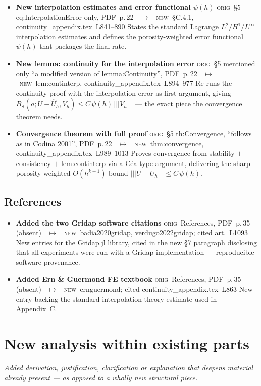\documentclass[11pt]{article}
\newcommand{\Orig}{\textcolor{origc}{\footnotesize\textsc{orig}}}
\newcommand{\New}{\textcolor{newc}{\footnotesize\textsc{new}}}
\newcommand{\code}[1]{\textcolor{newc}{\ttfamily\small #1}}
\newcommand{\pdfp}[1]{PDF~p.\,#1}
\newcommand{\artl}[1]{art.\ L#1}       %
\newcommand{\appl}[2]{#1~L#2}          %
\newcommand{\ch}[4]{%
  \item \textbf{#1}\newline
    {\footnotesize\Orig\ #2 \ \textcolor{locc}{$\longmapsto$} \ \New\ #3}\newline
    #4}
\begin{document}
\begin{itemize}
   {\code{lem:continuity}, \appl{continuity\_appendix.tex}{381}--817}
   {$B_{\mathrm S}$ is split into 18 terms mirroring Codina (2001) (42)--(59), each bounded by the
    triple norm through nine explicit steps, incl.\ the convective-pressure integration-by-parts
    group and facewise jump bookkeeping. The appendix's core result.}
\ch{New interpolation estimates and error functional $\psi(h)$}
   {\S5 \code{eq:InterpolationError} only, \pdfp{22}}
   {\S C.4.1, \appl{continuity\_appendix.tex}{841}--890}
   {States the standard Lagrange $L^2/H^1/L^\infty$ interpolation estimates and defines the
    porosity-weighted error functional $\psi(h)$ that packages the final rate.}
\ch{New lemma: continuity for the interpolation error}
   {\S5 mentioned only ``a modified version of \code{lemma:Continuity}'', \pdfp{22}}
   {\code{lem:continterp}, \appl{continuity\_appendix.tex}{894}--977}
   {Re-runs the continuity proof with the interpolation error as first argument, giving
    $B_{\mathrm S}(a;U-\widehat U_h,V_h)\le C\,\psi(h)\,|\!|\!|V_h|\!|\!|$ --- the exact piece the
    convergence theorem needs.}
\ch{Convergence theorem with full proof}
   {\S5 \code{th:Convergence}, ``follows as in Codina 2001'', \pdfp{22}}
   {\code{thm:convergence}, \appl{continuity\_appendix.tex}{989}--1013}
   {Proves convergence from stability $+$ consistency $+$ \code{lem:continterp} via a C\'ea-type
    argument, delivering the sharp porosity-weighted $O(h^{k+1})$ bound $|\!|\!|U-U_h|\!|\!|\le
    C\,\psi(h)$.}
\end{itemize}

\subsection{References}
\begin{itemize}
\ch{Added the two Gridap software citations}
   {References, \pdfp{35} (absent)}
   {\code{badia2020gridap}, \code{verdugo2022gridap}; cited \artl{1093}}
   {New entries for the Gridap.jl library, cited in the new \S7 paragraph disclosing that all
    experiments were run with a Gridap implementation --- reproducible software provenance.}
\ch{Added Ern \& Guermond FE textbook}
   {References, \pdfp{35} (absent)}
   {\code{ernguermond}; cited \appl{continuity\_appendix.tex}{863}}
   {New entry backing the standard interpolation-theory estimate used in Appendix~C.}
\end{itemize}

\section{New analysis within existing parts}
\emph{Added derivation, justification, clarification or explanation that deepens material already
present --- as opposed to a wholly new structural piece.}
\end{document}
